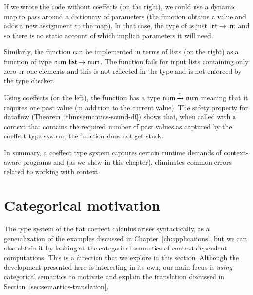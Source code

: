 If we wrote the code without coeffects (on the right), we could use a dynamic map to pass around
a dictionary of parameters (the  function obtains a value and  adds a new
assignment to the map). In that case, the type of  is just $\textnormal{\sffamily int}\rightarrow\textnormal{\sffamily int}$
and so there is no static account of which implicit parameters it will need.

Similarly, the  function can be implemented in terms of lists (on the right) as
a function of type $\textnormal{\sffamily num}~\textnormal{\sffamily list}\rightarrow\textnormal{\sffamily num}$. The function fails for input
lists containing only zero or one elements and this is not reflected in the type and is not
enforced by the type checker.

Using coeffects (on the left), the function has a type $\ident{num}\xrightarrow{\cclrd{1}}\ident{num}$
meaning that it requires one past value (in addition to the current value). The safety property
for dataflow (Theorem~\ref{thm:semantics-sound-df}) shows that, when called with a context that
contains the required number of past values as captured by the coeffect type system, the function
does not get stuck.

In summary, a coeffect type system captures certain runtime
demands of context-aware programs and (as we show in this chapter), eliminates common errors
related to working with context.



%
%

\section{Categorical motivation}
\label{sec:semantics-theory}

The type system of the flat coeffect calculus arises syntactically, as a generalization of the examples
discussed in Chapter~\ref{ch:applications}, but we can also obtain it by looking at the categorical
semantics of context-dependent computations. This is a direction that we explore in this section.
Although the development presented here is interesting in its own, our main focus is \emph{using}
categorical semantics to motivate and explain the translation discussed in
Section~\ref{sec:semantics-translation}.

